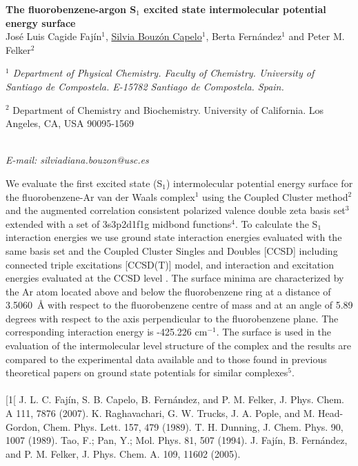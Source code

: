 \begin{center}
{\bf \Large
The fluorobenzene-argon S$_{1}$ excited state intermolecular potential energy surface
}
\\
\vspace{0.5cm}
José Luis Cagide Fajín$^{1}$,  \underline{Silvia Bouzón Capelo}$^{1}$,  Berta Fernández$^{1}$ and Peter M. Felker$^{2}$
\\
\vspace{0.5cm}
{\it 
$^{1}$ Department of Physical Chemistry. Faculty of Chemistry. University of Santiago de Compostela. E-15782 Santiago de Compostela. Spain.

$^{2}$ Department of Chemistry and Biochemistry. University of California. Los Angeles, CA, USA 90095-1569
}
\\
\vspace{0.5cm}
{\it E-mail: silviadiana.bouzon@usc.es}
\\
\vspace{0.5cm}
\end{center}
We evaluate the first excited state (S$_{1}$) intermolecular potential energy surface for the fluorobenzene-Ar van der Waals complex$^{1}$ using the Coupled Cluster method$^{2}$ and the augmented correlation consistent polarized valence double zeta basis set$^{3}$ extended with a set of 3s3p2d1f1g midbond functions$^{4}$. To calculate the S$_{1}$ interaction energies we use ground state interaction energies evaluated with the same basis set and the Coupled Cluster Singles and Doubles [CCSD] including connected triple excitations [CCSD(T)] model, and interaction and excitation energies evaluated at the CCSD level . The surface minima are characterized by the Ar atom located above and below the fluorobenzene ring at a distance of 3.5060~{\AA} with respect to the fluorobenzene centre of mass and at an angle of 5.89 degrees with respect to the axis perpendicular to the fluorobenzene plane. The corresponding interaction energy is -425.226 cm$^{-1}$. The surface is used in the evaluation of the intermolecular level structure of the complex and the results are compared to the experimental data available and to those found in previous theoretical papers on ground state potentials for similar complexes$^{5}$.
\\
\vspace{0.5cm}
\\
{\footnotesize
[1[ J. L. C. Fajín, S. B. Capelo, B. Fernández, and P. M. Felker, J. Phys. Chem. A 111, 7876 (2007).
\newline
[2] K. Raghavachari, G. W. Trucks, J. A. Pople, and M. Head-Gordon, Chem. Phys. Lett. 157, 479 (1989).
\newline
[3] T. H. Dunning, J. Chem. Phys. 90, 1007 (1989).
\newline
[4] Tao, F.; Pan, Y.; Mol. Phys. 81, 507 (1994).
\newline
[5] J. Fajín, B. Fernández, and P. M. Felker, J. Phys. Chem. A. 109, 11602 (2005).
}


